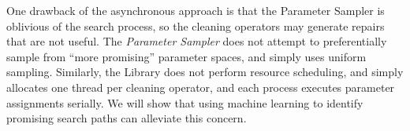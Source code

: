 One drawback of the asynchronous approach is that the Parameter Sampler is oblivious of the search process, so the cleaning operators may generate repairs that are not useful.   The {\it Parameter Sampler} does not attempt to preferentially sample from ``more promising'' parameter spaces, and simply uses uniform sampling.  Similarly, the Library does not perform resource scheduling, and simply allocates one thread per cleaning operator, and each process executes parameter assignments serially. 
We will show that using machine learning to identify promising search paths can alleviate this concern.




